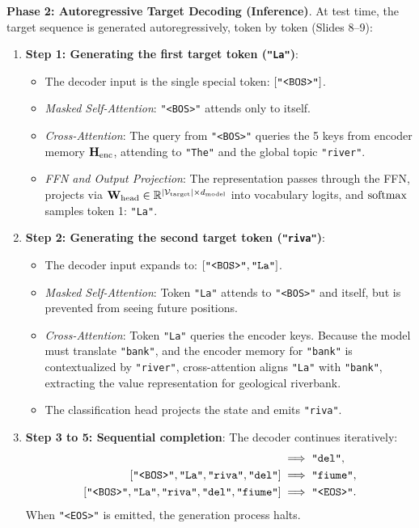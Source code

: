 \documentclass[../../main.tex]{subfiles}
\begin{document}
\noindent\textbf{Phase 2: Autoregressive Target Decoding (Inference)}.\newline
At test time, the target sequence is generated autoregressively, token by token (Slides 8--9):
\begin{enumerate}
    \item \textbf{Step 1: Generating the first target token (\texttt{"La"})}:
    \begin{itemize}
        \item The decoder input is the single special token: $[\text{\texttt{"<BOS>"}}]$.
        \item \emph{Masked Self-Attention}: \texttt{"<BOS>"} attends only to itself.
        \item \emph{Cross-Attention}: The query from \texttt{"<BOS>"} queries the 5 keys from encoder memory $\mathbf{H}_{\text{enc}}$, attending to \texttt{"The"} and the global topic \texttt{"river"}.
        \item \emph{FFN and Output Projection}: The representation passes through the FFN, projects via $\mathbf{W}_{\text{head}} \in \mathbb{R}^{|\mathcal{V}_{\text{target}}| \times d_{\text{model}}}$ into vocabulary logits, and $\operatorname{\mathrm{softmax}}$ samples token 1: \texttt{"La"}.
    \end{itemize}
    \item \textbf{Step 2: Generating the second target token (\texttt{"riva"})}:
    \begin{itemize}
        \item The decoder input expands to: $[\text{\texttt{"<BOS>"}}, \text{\texttt{"La"}}]$.
        \item \emph{Masked Self-Attention}: Token \texttt{"La"} attends to \texttt{"<BOS>"} and itself, but is prevented from seeing future positions.
        \item \emph{Cross-Attention}: Token \texttt{"La"} queries the encoder keys. Because the model must translate \texttt{"bank"}, and the encoder memory for \texttt{"bank"} is contextualized by \texttt{"river"}, cross-attention aligns \texttt{"La"} with \texttt{"bank"}, extracting the value representation for geological riverbank.
        \item The classification head projects the state and emits \texttt{"riva"}.
    \end{itemize}
    \item \textbf{Step 3 to 5: Sequential completion}: The decoder continues iteratively:
    \begin{align}
    [\text{\texttt{"<BOS>"}}, \text{\texttt{"La"}}, \text{\texttt{"riva"}}] &\implies \text{\texttt{"del"}}, \\
    [\text{\texttt{"<BOS>"}}, \text{\texttt{"La"}}, \text{\texttt{"riva"}}, \text{\texttt{"del"}}] &\implies \text{\texttt{"fiume"}}, \\
    [\text{\texttt{"<BOS>"}}, \text{\texttt{"La"}}, \text{\texttt{"riva"}}, \text{\texttt{"del"}}, \text{\texttt{"fiume"}}] &\implies \text{\texttt{"<EOS>"}}.
    \end{align}
    When \texttt{"<EOS>"} is emitted, the generation process halts.
\end{enumerate}
\end{document}
